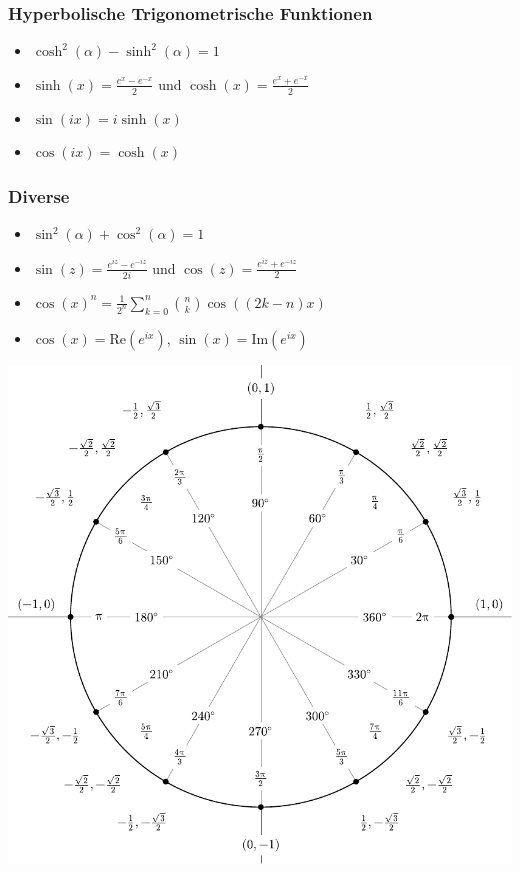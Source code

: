 \documentclass[a4paper,10pt]{article}
\def\Re{\text{Re}}
\def\Im{\text{Im}}
\begin{document}
\subsubsection{Hyperbolische Trigonometrische Funktionen}
\begin{itemize}
  \item $\cosh^2(\alpha) - \sinh^2(\alpha) = 1$
  \item $\sinh(x) = \frac{e^x - e^{-x}}{2}$ und $\cosh(x) = \frac{e^x + e^{-x}}{2}$
  \item $\sin(ix) = i \sinh(x)$
  \item $\cos(ix) = \cosh(x)$
 \end{itemize}

\subsubsection{Diverse}

\begin{itemize}
 \item $\sin^2(\alpha) + \cos^2(\alpha) = 1$
 \item $\sin(z) = \frac{e^{iz} - e^{-iz}}{2i}$ und $\cos(z) = \frac{e^{iz} + e^{-iz}}{2}$
 \item $\cos(x)^n = \frac{1}{2^n} \sum_{k=0}^n {n \choose k} \cos((2k - n)x)$
 \item $\cos(x) = \Re(e^{ix})$, $\sin(x) = \Im(e^{ix})$
\end{itemize}


\begin{center}
  \includegraphics[width= \linewidth]{include_degrees_circle.pdf}
\end{center}
\end{document}
